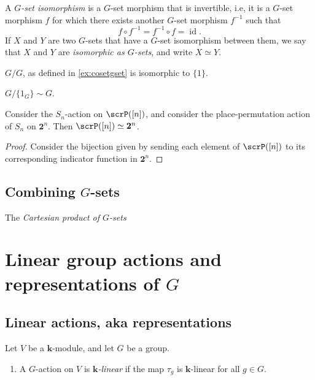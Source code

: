 \documentclass{article}
\DeclareMathOperator{\id}{id}
\begin{document}
\begin{definition}
    A \textit{$G$-set isomorphism} is a $G$-set morphism that is invertible, i.e, it is a $G$-set morphism $f$ for which there exists another $G$-set morphism $f^{-1}$ such that
    \[
        f \circ f^{-1} = f^{-1} \circ f = \id.
    \]
    If $X$ and $Y$ are two $G$-sets that have a $G$-set isomorphism between them, we say that $X$ and $Y$ are \textit{isomorphic as $G$-sets}, and write $X \simeq Y$.
\end{definition}

\begin{example}
    $G/G$, as defined in \ref{ex:cosetgset} is isomorphic to $\{1\}$.
\end{example}

\begin{example}
    $G/\{1_G\} \sim G$.
\end{example}

\begin{example}
    Consider the $S_n$-action on $\scrP([n])$, and consider the place-permutation action of $S_n$ on $\mathbf{2}^n$.
    Then $\scrP([n]) \simeq \mathbf{2}^n$.
\end{example}
\begin{proof}
    Consider the bijection given by sending each element of $\scrP([n])$ to its corresponding indicator function in $\mathbf{2}^n$.
\end{proof}

\subsection{Combining \texorpdfstring{$G$}{G}-sets}

\begin{definition}
    The \textit{Cartesian product of $G$-sets}
\end{definition}


\section{Linear group actions and representations of \texorpdfstring{$G$}{G}}

\subsection{Linear actions, aka representations}

\begin{definition}
    Let $V$ be a $\mathbf{k}$-module, and let $G$ be a group.
    \begin{enumerate}[label=(\alph*)]
        \item A $G$-action on $V$ is \textit{$\mathbf{k}$-linear} if the map $\tau_g$ is $\mathbf{k}$-linear for all $g \in G$.
    \end{enumerate}
\end{definition}
\end{document}
